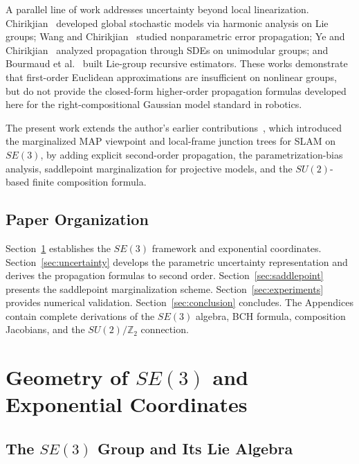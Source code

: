 \documentclass[journal]{IEEEtran}
\begin{document}
A parallel line of work addresses uncertainty beyond local 
linearization. Chirikjian~\cite{chirikjian2012stochastic} 
developed global stochastic models via harmonic analysis on 
Lie groups; Wang and Chirikjian~\cite{wang2008nonparametric} 
studied nonparametric error propagation; 
Ye and Chirikjian~\cite{ye2024uncertainty} analyzed propagation 
through SDEs on unimodular groups; and 
Bourmaud et al.~\cite{bourmaud2013discrete} built Lie-group 
recursive estimators. These works demonstrate that first-order 
Euclidean approximations are insufficient on nonlinear groups, 
but do not provide the closed-form higher-order propagation 
formulas developed here for the right-compositional Gaussian 
model standard in robotics.
 
The present work extends the author's earlier 
contributions~\cite{kuehnel2004,kuehnel2005,kuehnel2008}, 
which introduced the marginalized MAP viewpoint and 
local-frame junction trees for SLAM on $SE(3)$, by 
adding explicit second-order propagation, the 
parametrization-bias analysis, saddlepoint 
marginalization for projective models, and the 
$SU(2)$-based finite composition formula.
 
\subsection{Paper Organization}

Section~\ref{sec:SE3geometry} establishes the $SE(3)$ 
framework and exponential coordinates. 
Section~\ref{sec:uncertainty} develops the parametric 
uncertainty representation and derives the propagation 
formulas to second order. 
Section~\ref{sec:saddlepoint} presents the saddlepoint 
marginalization scheme. 
Section~\ref{sec:experiments} provides numerical validation.
Section~\ref{sec:conclusion} concludes. 
The Appendices contain complete derivations of the $SE(3)$ 
algebra, BCH formula, composition Jacobians, and the 
$SU(2)/\mathbb{Z}_2$ connection.

\section{Geometry of $SE(3)$ and Exponential Coordinates}
\label{sec:SE3geometry}

\subsection{The $SE(3)$ Group and Its Lie Algebra}
\end{document}
